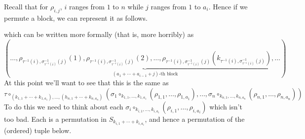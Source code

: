 \begin{example}
Recall that for $\rho_{i, j}$, $i$ ranges from $1$ to $n$ 
while $j$ ranges from $1$ to $a_i$. Hence if we permute a block, we can represent it as follows. 
\begin{center}
\end{center}
which can be written more formally (that is, more horribly) as 
\[
    (
    \dots,
    \underbrace{\rho_{\tau^{-1}(i), \sigma_{\tau^{-1}(i)}^{-1}(j)}(1), 
    \rho_{\tau^{-1}(i), \sigma_{\tau^{-1}(i)}^{-1}(j)}(2),
    \dots, 
    \rho_{\tau^{-1}(i), \sigma_{\tau^{-1}(i)}^{-1}(j)}(k_{\tau^{-1}(i), \sigma_{\tau^{-1}(i)}^{-1}(j)})
    }_{(a_1 + \cdots + a_{i-1}+j)\text{-th block}}
    ,\dots
    )
\]
At this point we'll want to see that this is the same as 
\[
    \tau \circ_{(k_{1,1} + \cdots + k_{1,a_1}), \dots, (h_{n, 1} + \cdots + k_{n,a_n})}
    (\sigma_1 \circ_{k_{1,1}, \dots, k_{1,a_1}}(\rho_{1,1}, \dots, \rho_{1,a_1}),
    \dots,
    \sigma_n \circ_{k_{n,1}, \dots, k_{n,a_n}}(\rho_{n,1}, \dots, \rho_{n,a_n}) 
    )
\]  
To do this we need to think about each $\sigma_i \circ_{k_{i, 1}, \dots, k_{i, a_i}}(\rho_{i,1}, \dots, \rho_{i, a_i})$
which isn't too bad. Each is a permutation in $S_{k_{i,1} + \cdots + k_{i, a_i}}$, and 
hence a permutation of the (ordered) tuple below. 

\end{example}
